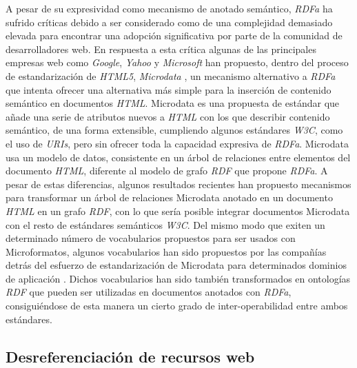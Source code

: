 A pesar de su expresividad como mecanismo de anotado sem\'antico, \textit{RDFa} ha sufrido cr\'iticas debido a ser considerado como de una complejidad demasiado elevada para encontrar una adopci\'on significativa por parte de la comunidad de desarrolladores web. En respuesta a esta cr\'itica algunas de las principales empresas web como \textit{Google}, \textit{Yahoo} y \textit{Microsoft} han propuesto, dentro del proceso de estandarizaci\'on de \textit{HTML5},  \textit{Microdata} \cite{microdata}, un mecanismo alternativo a \textit{RDFa} que intenta ofrecer una alternativa m\'as simple para la inserci\'on de contenido sem\'antico en documentos \textit{HTML}. Microdata es una propuesta de est\'andar que a\~nade una serie de atributos nuevos a \textit{HTML} con los que describir contenido sem\'antico, de una forma extensible, cumpliendo algunos est\'andares \textit{W3C}, como el uso de \textit{URIs}, pero sin ofrecer toda la capacidad expresiva de \textit{RDFa}. Microdata usa un modelo de datos, consistente en un \'arbol de relaciones entre elementos del documento \textit{HTML}, diferente al modelo de grafo \textit{RDF} que propone \textit{RDFa}. A pesar de estas diferencias, algunos resultados recientes \cite{hickson2012microdata} han propuesto mecanismos para transformar un \'arbol de relaciones Microdata anotado en un documento \textit{HTML} en un grafo \textit{RDF}, con lo que ser\'ia posible integrar documentos Microdata con el resto de est\'andares sem\'anticos \textit{W3C}. Del mismo modo que exiten un determinado n\'umero de vocabularios propuestos para ser usados con Microformatos, algunos vocabularios han sido propuestos por las compa\~n\'ias detr\'as del esfuerzo de estandarizaci\'on de Microdata para determinados dominios de aplicaci\'on \cite{ronallo2012html5}. Dichos vocabularios han sido tambi\'en transformados en ontolog\'ias \textit{RDF} que pueden ser utilizadas en documentos anotados con \textit{RDFa}, consigui\'endose de esta manera un cierto grado de inter-operabilidad entre ambos est\'andares.\\

\subsection{Desreferenciaci\'on de recursos web}

